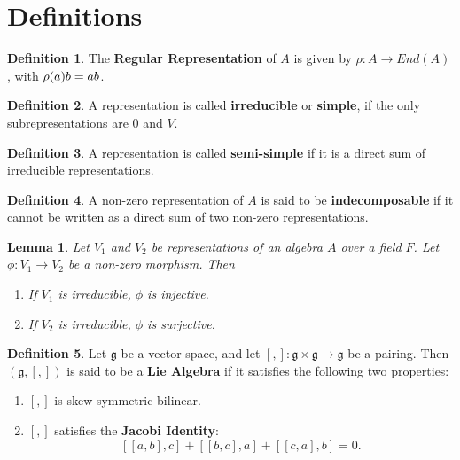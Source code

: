 \documentclass[a4paper]{article}
\theoremstyle{theorem}
\newtheorem{lemma}[theorem]{Lemma}
\theoremstyle{definition}
\newtheorem{definition}{Definition} [section]
\theoremstyle{remark}
\theoremstyle{gremark}
\theoremstyle{discussion}
\theoremstyle{notation}
\begin{document}
	
	
	
	\section*{Definitions}
	
	
	\begin{definition}
		The \textbf{Regular Representation} of $A$ is given by $\rho: A\to End(A) $, with 
		$\newline\rho(a)b=ab$.
	\end{definition}
	
	\begin{definition}
		A representation is called \textbf{irreducible} or \textbf{simple}, if the only subrepresentations are $0$ and $V$.
	\end{definition}

	\begin{definition}
		A representation is called \textbf{semi-simple} if it is a direct sum of irreducible representations.
	\end{definition}

	\begin{definition}
		A non-zero representation of $A$ is said to be \textbf{indecomposable} if it cannot be written as a direct sum of two non-zero representations.
	\end{definition}

	\begin{lemma}
		Let $V_1$ and $V_2$ be representations of an algebra $A$ over a field $F$. Let $\phi: V_1\to V_2$ be a non-zero morphism. Then
		\begin{enumerate}
			\item If $V_1$ is irreducible, $\phi$ is injective.
			\item If $V_2$ is irreducible, $\phi$ is surjective.
		\end{enumerate}
	\end{lemma}

	

	\begin{definition}
		Let $\mathfrak{g}$ be a vector space, and let $[,]:\mathfrak{g}\times\mathfrak{g}\to \mathfrak{g}$ be a pairing. Then $(\mathfrak{g},[,])$ is said to be a \textbf{Lie Algebra} if it satisfies the following two properties:
		\begin{enumerate}
			\item $[,]$ is skew-symmetric bilinear.
			\item $[,]$ satisfies the \textbf{Jacobi Identity}: 
			$$[[a,b],c]+[[b,c],a]+[[c,a],b]=0.$$
		\end{enumerate}
	\end{definition}
\end{document}
